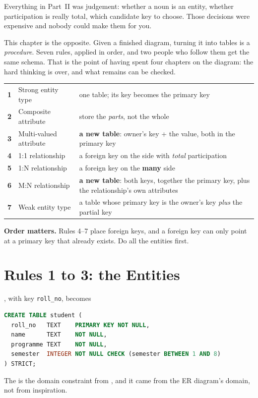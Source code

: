 Everything in Part~II was judgement: whether a noun is an entity, whether
participation is really total, which candidate key to choose. Those decisions
were expensive and nobody could make them for you.

This chapter is the opposite. Given a finished diagram, turning it into tables
is a \emph{procedure}. Seven rules, applied in order, and two people who
follow them get the same schema. That is the point of having spent four
chapters on the diagram: the hard thinking is over, and what remains can be
checked.

\begin{conceptbox}
\begin{tabular}{@{}R{0.7cm}L{5.3cm}L{8.0cm}@{}}
\textbf{1} & Strong entity type & one table; its key becomes the primary key \\
\textbf{2} & Composite attribute & store the \emph{parts}, not the whole \\
\textbf{3} & Multi-valued attribute & \textbf{a new table}: owner's key +
  the value, both in the primary key \\
\textbf{4} & 1:1 relationship & a foreign key on the side with \emph{total}
  participation \\
\textbf{5} & 1:N relationship & a foreign key on the \textbf{many} side \\
\textbf{6} & M:N relationship & \textbf{a new table}: both keys, together the
  primary key, plus the relationship's own attributes \\
\textbf{7} & Weak entity type & a table whose primary key is the owner's key
  \emph{plus} the partial key \\
\end{tabular}

\smallskip
\textbf{Order matters.} Rules 4--7 place foreign keys, and a foreign key can
only point at a primary key that already exists. Do all the entities first.
\end{conceptbox}

\section{Rules 1 to 3: the Entities}

\begin{examplebox}
, with key \texttt{roll\_no}, becomes

\medskip
{}

\medskip
\begin{lstlisting}[language=sql]
CREATE TABLE student (
  roll_no   TEXT    PRIMARY KEY NOT NULL,
  name      TEXT    NOT NULL,
  programme TEXT    NOT NULL,
  semester  INTEGER NOT NULL CHECK (semester BETWEEN 1 AND 8)
) STRICT;
\end{lstlisting}

The  is the domain constraint from , and it
came from the ER diagram's domain, not from inspiration.
\end{examplebox}

